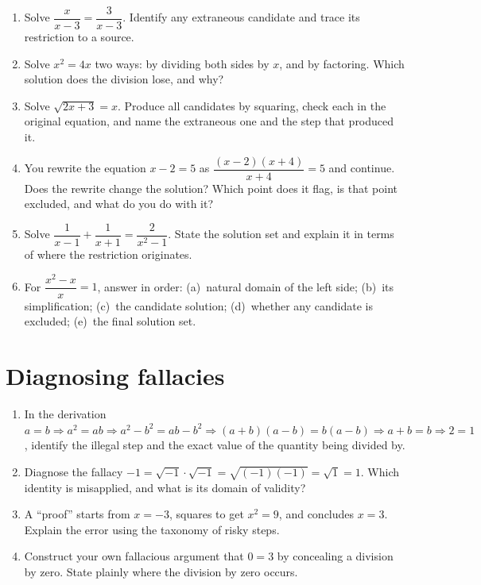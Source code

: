 \documentclass{essay}
\begin{document}
\begin{enumerate}[resume]

  \item Solve $\dfrac{x}{x-3} = \dfrac{3}{x-3}$. Identify any extraneous candidate and trace
    its restriction to a source.

  \item Solve $x^2 = 4x$ two ways: by dividing both sides by $x$, and by factoring. Which
    solution does the division lose, and why?

  \item Solve $\sqrt{2x+3} = x$. Produce all candidates by squaring, check each in the
    original equation, and name the extraneous one and the step that produced it.

  \item You rewrite the equation $x - 2 = 5$ as $\dfrac{(x-2)(x+4)}{x+4} = 5$ and continue.
    Does the rewrite change the solution? Which point does it flag, is that point excluded, and
    what do you do with it?

  \item Solve $\dfrac{1}{x-1} + \dfrac{1}{x+1} = \dfrac{2}{x^2-1}$. State the solution set and
    explain it in terms of where the restriction originates.

  \item For $\dfrac{x^2 - x}{x} = 1$, answer in order: (a)~natural domain of the left side;
    (b)~its simplification; (c)~the candidate solution; (d)~whether any candidate is excluded;
    (e)~the final solution set.

\end{enumerate}

\section{Diagnosing fallacies}

\begin{enumerate}[resume]

  \item In the derivation $a=b \Rightarrow a^2=ab \Rightarrow a^2-b^2 = ab-b^2 \Rightarrow
    (a+b)(a-b) = b(a-b) \Rightarrow a+b = b \Rightarrow 2=1$, identify the illegal step and the
    exact value of the quantity being divided by.

  \item Diagnose the fallacy
    $-1 = \sqrt{-1}\cdot\sqrt{-1} = \sqrt{(-1)(-1)} = \sqrt{1} = 1$.
    Which identity is misapplied, and what is its domain of validity?

  \item A ``proof'' starts from $x = -3$, squares to get $x^2 = 9$, and concludes $x = 3$.
    Explain the error using the taxonomy of risky steps.

  \item Construct your own fallacious argument that $0 = 3$ by concealing a division by zero.
    State plainly where the division by zero occurs.

\end{enumerate}
\end{document}
